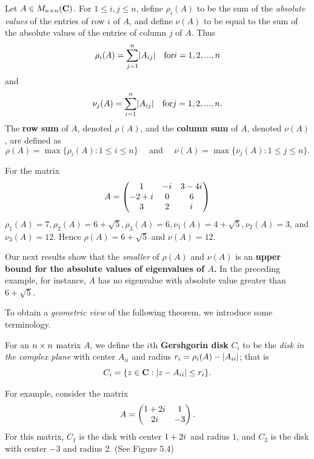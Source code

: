 \begin{definition} \label{def 5.12}
Let \(A \in M_{n \times n}(\mathbf{C})\).
For \(1 \le i, j \le n\), define \(\rho_i(A)\) to be the sum of the \emph{absolute values} of the entries of row \(i\) of \(A\), and define \(\nu(A)\) to be equal to the sum of the absolute values of the entries of column \(j\) of \(A\).
Thus
\[
    \rho_i(A) = \sum_{j = 1}^n \lvert A_{ij}\rvert \quad \text{for} i = 1, 2, ..., n
\]
and
\[
    \nu_j(A) = \sum_{i = 1}^n \lvert A_{ij}\rvert \quad \text{for} j = 1, 2, ..., n.
\]
The \textbf{row sum} of \(A\), denoted \(\rho(A)\), and the \textbf{column sum} of \(A\), denoted \(\nu(A)\), are defined as
\[
    \rho(A) = \max \{ \rho_i(A) : 1 \le i \le n \} \quad \text{ and } \quad \nu(A) = \max \{ \nu_j(A) : 1 \le j \le n \}.
\]
\end{definition}

\begin{example} \label{example 5.3.3}
For the matrix
\[
    A = \begin{pmatrix}
        1 & -{i\mkern1mu} & 3-4{i\mkern1mu} \\
        -2+{i\mkern1mu} & 0 & 6 \\
        3 & 2 & {i\mkern1mu}
    \end{pmatrix}
\]
\(\rho_1(A) = 7, \rho_2(A) = 6 + \sqrt{5}, \rho_3(A) = 6, \nu_1(A) = 4 + \sqrt{5}, \nu_2(A) = 3\), and  \(\nu_3(A) = 12\).
Hence \(\rho(A) = 6 + \sqrt{5}\) and \(\nu(A) = 12\).
\end{example}

Our next results show that the \emph{smaller} of \(\rho(A)\) and \(\nu(A)\) is an \textbf{upper bound for the absolute values of eigenvalues of \(A\).} 
In the preceding example, for instance, \(A\) has no eigenvalue with absolute value greater than \(6 + \sqrt{5}\).

To obtain a \emph{geometric view} of the following theorem, we introduce some terminology.
\begin{additional definition}
For an \(n \times n\) matrix \(A\), we define the \(i\)th \textbf{Gershgorin disk} \(C_i\) to be the \emph{disk in the complex plane} with center \(A_{ii}\) and radius \(r_i = \rho_i(A) - \lvert A_{ii}\rvert\);
that is
\[
    C_i = \{ z \in \mathbf{C} : \lvert z - A_{ii}\rvert \le r_i \}.
\]
\end{additional definition}

For example, consider the matrix
\[
    A = \begin{pmatrix} 1 + 2 {i\mkern1mu} & 1 \\ 2 {i\mkern1mu} & -3 \end{pmatrix}.
\]
For this matrix, \(C_1\) is the disk with center \(1 + 2{i\mkern1mu}\) and radius \(1\), and \(C_2\) is the disk with center \(-3\) and radius \(2\).
(See Figure 5.4)

